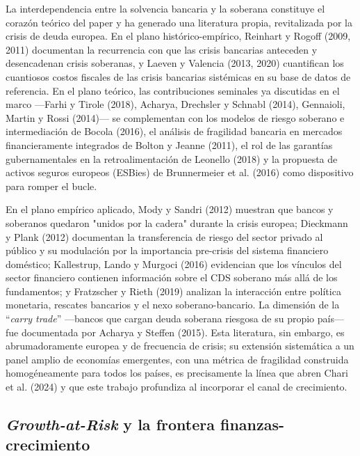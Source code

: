 \documentclass[5p,times,twocolumn,authoryear]{elsarticle}
\begin{document}
La interdependencia entre la solvencia bancaria y la soberana constituye el corazón teórico del paper y ha generado una literatura propia, revitalizada por la crisis de deuda europea. En el plano histórico-empírico, Reinhart y Rogoff (2009, 2011) documentan la recurrencia con que las crisis bancarias anteceden y desencadenan crisis soberanas, y Laeven y Valencia (2013, 2020) cuantifican los cuantiosos costos fiscales de las crisis bancarias sistémicas en su base de datos de referencia. En el plano teórico, las contribuciones seminales ya discutidas en el marco —Farhi y Tirole (2018), Acharya, Drechsler y Schnabl (2014), Gennaioli, Martin y Rossi (2014)— se complementan con los modelos de riesgo soberano e intermediación de Bocola (2016), el análisis de fragilidad bancaria en mercados financieramente integrados de Bolton y Jeanne (2011), el rol de las garantías gubernamentales en la retroalimentación de Leonello (2018) y la propuesta de activos seguros europeos (ESBies) de Brunnermeier et al. (2016) como dispositivo para romper el bucle.

En el plano empírico aplicado, Mody y Sandri (2012) muestran que bancos y soberanos quedaron "unidos por la cadera" durante la crisis europea; Dieckmann y Plank (2012) documentan la transferencia de riesgo del sector privado al público y su modulación por la importancia pre-crisis del sistema financiero doméstico; Kallestrup, Lando y Murgoci (2016) evidencian que los vínculos del sector financiero contienen información sobre el CDS soberano más allá de los fundamentos; y Fratzscher y Rieth (2019) analizan la interacción entre política monetaria, rescates bancarios y el nexo soberano-bancario. La dimensión de la ``\textit{carry trade}'' —bancos que cargan deuda soberana riesgosa de su propio país— fue documentada por Acharya y Steffen (2015). Esta literatura, sin embargo, es abrumadoramente europea y de frecuencia de crisis; su extensión sistemática a un panel amplio de economías emergentes, con una métrica de fragilidad construida homogéneamente para todos los países, es precisamente la línea que abren Chari et al. (2024) y que este trabajo profundiza al incorporar el canal de crecimiento.

\subsection{\textit{Growth-at-Risk} y la frontera finanzas-crecimiento}
\end{document}
